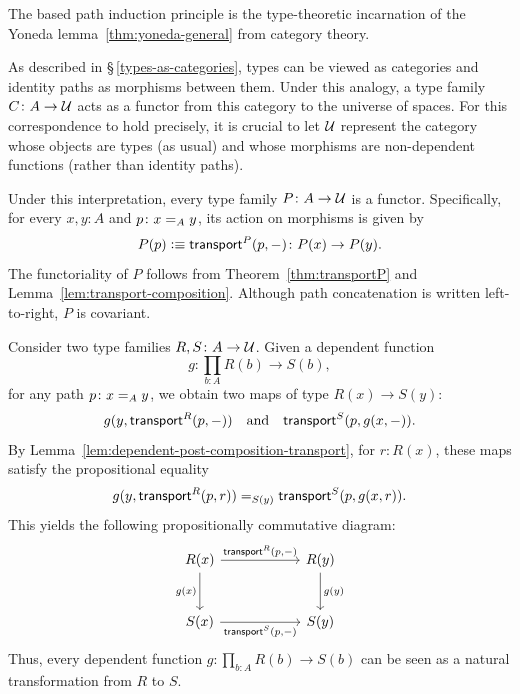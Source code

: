 \begin{rem}\label{rem:yoneda-path-induction-correspondence}
    The based path induction principle is the type-theoretic incarnation of the Yoneda lemma~\ref{thm:yoneda-general} from category theory. 
    
    As described in \S\,\ref{types-as-categories}, types can be viewed as categories and identity paths as morphisms between them. Under this analogy, a type family $C\colon A\to\univ$ acts as a functor from this category to the universe of spaces. For this correspondence to hold precisely, it is crucial to let $\mathcal U$ represent the category whose objects are types (as usual) and whose morphisms are non-dependent functions (rather than identity paths).
    
    Under this interpretation, every type family $P\colon A\to\univ$ is a functor. Specifically, for every $x,y\colon A$ and $p\colon x\eq Ay$, its action on morphisms is given by
    \[
        P(p)\defeq
            \fun{transport}^P(p,\dummy)
            \colon P(x)\to P(y).
    \]
    The functoriality of $P$ follows from Theorem~\ref{thm:transportP} and Lemma~\ref{lem:transport-composition}. Although path concatenation is written left-to-right, $P$ is covariant. 
    
    Consider two type families $R,S\colon A\to\univ$. Given a dependent function
    \[
        g\colon\prod_{b\colon A}R(b)\to S(b),
    \]
    for any path $p\colon x\eq{A}y$, we obtain two maps of type $R(x)\to S(y)$:
    \[
        g(y,\mathsf{transport}^R(p,{\mathord-}))
        \quad\text{and}\quad
        \mathsf{transport}^S(p,g(x,{\mathord-})).
    \]
    By Lemma~\ref{lem:dependent-post-composition-transport}, for $r\colon R(x)$, these maps satisfy the propositional equality
    \[
        g(y,\mathsf{transport}^R(p,r))
        \mathrel{=_{S(y)}}
        \mathsf{transport}^S(p,g(x,r)).
    \]
    This yields the following propositionally commutative diagram:
    \[
        \begin{tikzcd}[row sep=large,column sep=2cm]
            R(x)
                \arrow[r,
                    "{\fun{transport}^R(p,\dummy)}"
                    ]
                \arrow[d,"g(x)"']
            &R(y)
                \arrow[d,"g(y)"]\\
            S(x)
                \arrow[r,
                    "{\fun{transport}^S(p,\dummy)}"'
                ]
            &S(y)
        \end{tikzcd}
    \]
    Thus, every dependent function $g\colon\prod_{b\colon A}R(b)\to S(b)$ can be seen as a natural transformation from $R$ to $S$. 
    

\end{rem}
